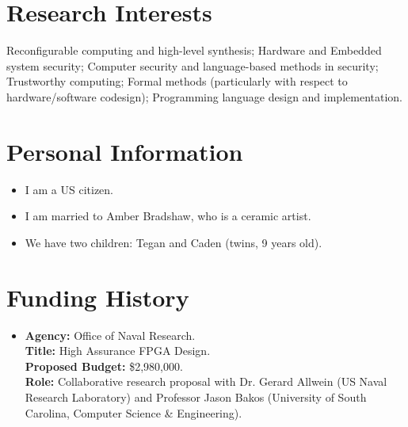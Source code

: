 \documentclass[11pt]{article}
\begin{document}
\section{Research Interests}

Reconfigurable computing and high-level synthesis; Hardware and Embedded system security;
Computer security and
language-based methods in security; Trustworthy computing; Formal methods (particularly with respect to
hardware/software codesign);  Programming language
design and implementation.

\section{Personal Information}

\begin{itemize}[leftmargin=0mm]
\item[]  I am a US citizen.


\item[]  I am married to Amber Bradshaw, who is a ceramic artist.

\item[]  We have two children: Tegan and Caden (twins, 9 years old). 

\end{itemize}




\section{Funding History}


\begin{itemize}[leftmargin=0.0mm]
\item[]
{\bf Agency:} Office of Naval Research.
\\
{\bf Title:} High Assurance FPGA Design.
\\
{\bf Proposed Budget:} \$2,980,000.
\\
{\bf Role:}    Collaborative research proposal with Dr. Gerard Allwein (US Naval Research Laboratory) and Professor Jason Bakos (University of South Carolina, Computer Science \& Engineering).

\end{itemize}
\end{document}
